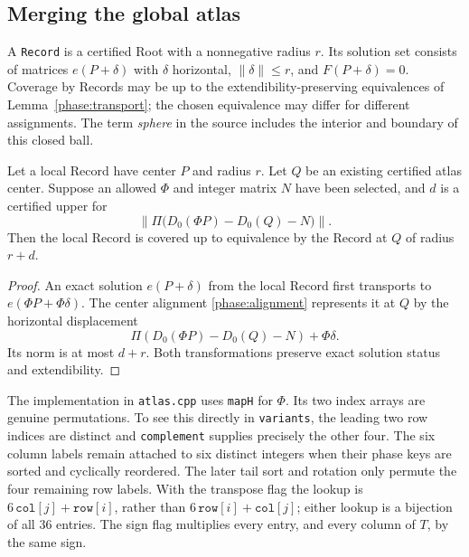 \subsection{Merging the global atlas}

\begin{definition}
\label{phase:record}
A \texttt{Record} is a certified Root with a nonnegative radius \(r\).
Its solution set consists of matrices \(e(P+\delta)\) with
\(\delta\) horizontal, \(\|\delta\|\leq r\), and \(F(P+\delta)=0\).
Coverage by Records may be up to the extendibility-preserving
equivalences of Lemma~\ref{phase:transport}; the chosen equivalence
may differ for different assignments.  The term \emph{sphere} in the
source includes the interior and boundary of this closed ball.
\end{definition}

\begin{lemma}
\label{phase:atlas-merge}
Let a local Record have center \(P\) and radius \(r\).  Let \(Q\)
be an existing certified atlas center.  Suppose an allowed
\(\Phi\) and integer matrix \(N\) have been selected, and \(d\) is
a certified upper for
\[
 \left\|\Pi\bigl(D_0(\Phi P)-D_0(Q)-N\bigr)\right\|.
\]
Then the local Record is covered up to equivalence by the Record
at \(Q\) of radius \(r+d\).
\end{lemma}

\begin{proof}
An exact solution \(e(P+\delta)\) from the local Record first
transports to \(e(\Phi P+\Phi\delta)\).  The center alignment
\eqref{phase:alignment} represents it at \(Q\) by the horizontal
displacement
\[
 \Pi(D_0(\Phi P)-D_0(Q)-N)+\Phi\delta.
\]
Its norm is at most \(d+r\).  Both transformations preserve exact
solution status and extendibility.
\end{proof}

The implementation in \texttt{atlas.cpp} uses \texttt{mapH} for
\(\Phi\).  Its two index arrays are genuine permutations.  To see
this directly in \texttt{variants}, the leading two row indices
are distinct and \texttt{complement} supplies precisely the other
four.  The six column labels remain attached to six distinct
integers when their phase keys are sorted and cyclically reordered.
The later tail sort and rotation only permute the four remaining
row labels.  With the transpose flag the lookup is
\(6\,\mathtt{col}[j]+\mathtt{row}[i]\), rather than
\(6\,\mathtt{row}[i]+\mathtt{col}[j]\); either lookup is a bijection
of all \(36\) entries.  The sign flag multiplies every entry, and
every column of \(T\), by the same sign.

